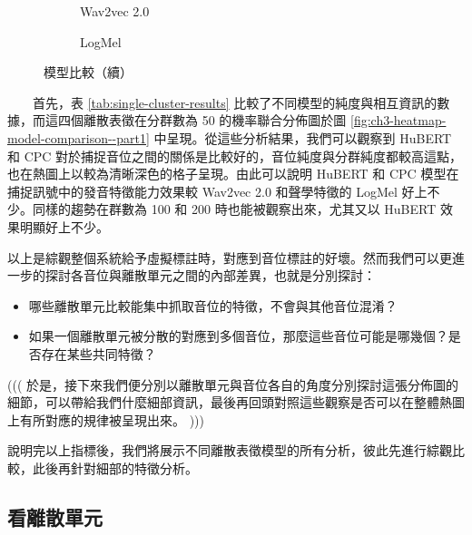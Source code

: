 {{\begin{figure}
          \begin{subfigure}{\textwidth}  %
         \centering
         \caption{Wav2vec 2.0}
         \label{fig:ch3-heatmap-model--w2v2-50-joint-byprob}
     \end{subfigure}
     
     \vfill
     \begin{subfigure}{\textwidth}  %
         \centering
         \caption{LogMel}
         \label{fig:ch3-heatmap-model--logmel-50-joint-byprob}
     \end{subfigure}
     \caption{模型比較（續）}
     \label{fig:ch3-heatmap-model-comparison--part2}
\end{figure}

}  %

　　首先，表 \ref{tab:single-cluster-results} 比較了不同模型的純度與相互資訊的數據，而這四個離散表徵在分群數為 50 的機率聯合分佈圖於圖 \ref{fig:ch3-heatmap-model-comparison--part1} 中呈現。從這些分析結果，我們可以觀察到 HuBERT 和 CPC 對於捕捉音位之間的關係是比較好的，音位純度與分群純度都較高這點，也在熱圖上以較為清晰深色的格子呈現。由此可以說明 HuBERT 和 CPC 模型在捕捉訊號中的發音特徵能力效果較 Wav2vec 2.0 和聲學特徵的 LogMel 好上不少。同樣的趨勢在群數為 100 和 200 時也能被觀察出來，尤其又以 HuBERT 效果明顯好上不少。


        以上是綜觀整個系統給予虛擬標註時，對應到音位標註的好壞。然而我們可以更進一步的探討各音位與離散單元之間的內部差異，也就是分別探討：
\begin{itemize}
    \item 哪些離散單元比較能集中抓取音位的特徵，不會與其他音位混淆？
    \item 如果一個離散單元被分散的對應到多個音位，那麼這些音位可能是哪幾個？是否存在某些共同特徵？
\end{itemize}

((( 於是，接下來我們便分別以離散單元與音位各自的角度分別探討這張分佈圖的細節，可以帶給我們什麼細部資訊，最後再回頭對照這些觀察是否可以在整體熱圖上有所對應的規律被呈現出來。 )))

        說明完以上指標後，我們將展示不同離散表徵模型的所有分析，彼此先進行綜觀比較，此後再針對細部的特徵分析。

\subsection{看離散單元}  %

}
